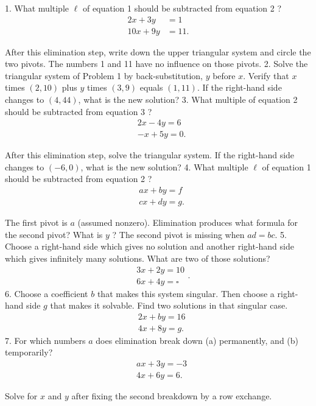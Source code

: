 1. What multiple $\ell$ of equation 1 should be subtracted from equation 2 ?
$$
\begin{aligned}
2 x+3 y & =1 \\
10 x+9 y & =11 .
\end{aligned}
$$

After this elimination step, write down the upper triangular system and circle the two pivots. The numbers 1 and 11 have no influence on those pivots.
2. Solve the triangular system of Problem 1 by back-substitution, $y$ before $x$. Verify that $x$ times $(2,10)$ plus $y$ times $(3,9)$ equals $(1,11)$. If the right-hand side changes to $(4,44)$, what is the new solution?
3. What multiple of equation 2 should be subtracted from equation 3 ?
$$
\begin{aligned}
& 2 x-4 y=6 \\
& -x+5 y=0 .
\end{aligned}
$$

After this elimination step, solve the triangular system. If the right-hand side changes to $(-6,0)$, what is the new solution?
4. What multiple $\ell$ of equation 1 should be subtracted from equation 2 ?
$$
\begin{aligned}
& a x+b y=f \\
& c x+d y=g .
\end{aligned}
$$

The first pivot is $a$ (assumed nonzero). Elimination produces what formula for the second pivot? What is $y$ ? The second pivot is missing when $a d=b c$.
5. Choose a right-hand side which gives no solution and another right-hand side which gives infinitely many solutions. What are two of those solutions?
$$
\begin{aligned}
& 3 x+2 y=10 \\
& 6 x+4 y=\square
\end{aligned} .
$$
6. Choose a coefficient $b$ that makes this system singular. Then choose a right-hand side $g$ that makes it solvable. Find two solutions in that singular case.
$$
\begin{aligned}
& 2 x+b y=16 \\
& 4 x+8 y=g .
\end{aligned}
$$
7. For which numbers $a$ does elimination break down (a) permanently, and (b) temporarily?
$$
\begin{aligned}
& a x+3 y=-3 \\
& 4 x+6 y=6 .
\end{aligned}
$$

Solve for $x$ and $y$ after fixing the second breakdown by a row exchange.
